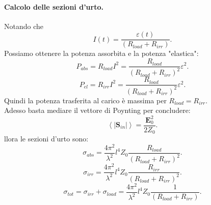 \paragraph{Calcolo delle sezioni d'urto.}
Notando che 
\[
	I\left( t \right) = \frac{\varepsilon\left( t \right) }{\left( R_{load} + R_{irr} \right) }
.\] 
Possiamo ottenere la potenza assorbita e la potenza "elastica":
\[
	P_{abs} = R_{load} I^2 = \frac{R_{load}}{\left( R_{load} + R_{irr} \right) ^2}\varepsilon^2
.\] 
\[
P_{el} = R_{irr} I^2 =  \frac{R_{load}}{\left( R_{load} + R_{irr} \right) ^2}\varepsilon^2
.\] 
Quindi la potenza trasferita al carico è massima per $R_{load} = R_{irr}$.\\
Adesso basta mediare il vettore di Poynting per concludere:
\[
\left< \left| \boldsymbol{S}_{in} \right| \right> = \frac{\boldsymbol{E}_0^2}{2Z_0}
.\] 
llora le sezioni d'urto sono:
\[
	\sigma_{abs} = \frac{4\pi^2}{\lambda^2}l^4Z_0 \frac{R_{load}}{\left(R_{load} + R_{irr}\right)^2}
.\] 
\[
	\sigma_{irr} = \frac{4\pi^2}{\lambda^2}l^4Z_0 \frac{R_{irr}}{\left(R_{load} + R_{irr}\right)^2}
.\]
\[
	\sigma_{tot} = \sigma_{irr} + \sigma_{load} = \frac{4\pi^2}{\lambda^2}l^4Z_0 \frac{1}{\left(R_{load} + R_{irr}\right)}
.\] 

